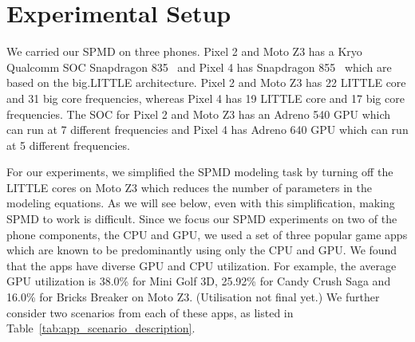\section{Experimental Setup}
\label{sec:etup}



 



We carried our SPMD on three phones.
Pixel 2 and Moto Z3 has a Kryo Qualcomm SOC Snapdragon 835~\cite{snapdragon835} and Pixel 4 has Snapdragon 855~\cite{snapdragon855} which are based on the big.LITTLE architecture.
Pixel 2 and Moto Z3 has 22 LITTLE core and 31 big core frequencies, whereas Pixel 4
has 19 LITTLE core and 17 big core frequencies.
The SOC for Pixel 2 and Moto Z3 has an Adreno 540 GPU which can run at 7 different frequencies 
and 
Pixel 4 has Adreno 640 GPU which can run at 5 different frequencies.

For our experiments, we simplified the SPMD modeling task by turning off the LITTLE cores on Moto Z3
which reduces the number of parameters in the modeling equations.
As we will see below, even with this simplification, making SPMD to work is difficult. 
Since we focus our SPMD experiments on two of the phone components, the CPU and GPU,
we used a set of {three} popular game apps which are known to be predominantly
using only the CPU and GPU. We found that the apps have diverse GPU and CPU utilization. 
For example, the average GPU utilization is 38.0\% for Mini Golf 3D,
25.92\% for Candy Crush Saga and 16.0\% for Bricks Breaker on Moto Z3.
(Utilisation not final yet.)
We further consider two scenarios from each of these apps,
as listed in Table~\ref{tab:app_scenario_description}.

